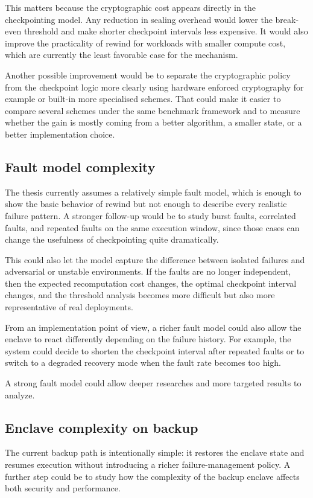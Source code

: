 \documentclass[11pt,a4paper]{report}
\begin{document}
This matters because the cryptographic cost appears directly in the checkpointing model. Any reduction in sealing overhead would lower the break-even threshold and make shorter checkpoint intervals less expensive. 
It would also improve the practicality of rewind for workloads with smaller compute cost, which are currently the least favorable case for the mechanism.

Another possible improvement would be to separate the cryptographic policy from the checkpoint logic more clearly using hardware enforced cryptography for example or built-in more specialised schemes. 
That could make it easier to compare several schemes under the same benchmark framework and to measure whether the gain is mostly coming from a better algorithm, a smaller state, or a better implementation choice.

\subsection{Fault model complexity}
\label{sub:fault-model}
The thesis currently assumes a relatively simple fault model, which is enough to show the basic behavior of rewind but not enough to describe every realistic failure pattern. 
A stronger follow-up would be to study burst faults, correlated faults, and repeated faults on the same execution window, since those cases can change the usefulness of checkpointing quite dramatically. 

This could also let the model capture the difference between isolated failures and adversarial or unstable environments. 
If the faults are no longer independent, then the expected recomputation cost changes, the optimal checkpoint interval changes, and the threshold analysis becomes more difficult but also more representative of real deployments.

From an implementation point of view, a richer fault model could also allow the enclave to react differently depending on the failure history. 
For example, the system could decide to shorten the checkpoint interval after repeated faults or to switch to a degraded recovery mode when the fault rate becomes too high.

A strong fault model could allow deeper researches and more targeted results to analyze. 

\subsection{Enclave complexity on backup}
\label{sub:back-complexity}
The current backup path is intentionally simple: it restores the enclave state and resumes execution without introducing a richer failure-management policy. 
A further step could be to study how the complexity of the backup enclave affects both security and performance.
\end{document}
